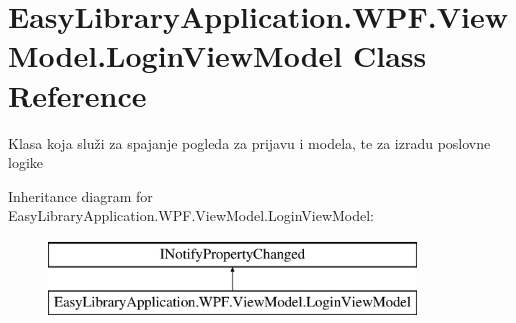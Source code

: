 \hypertarget{class_easy_library_application_1_1_w_p_f_1_1_view_model_1_1_login_view_model}{}\section{Easy\+Library\+Application.\+W\+P\+F.\+View\+Model.\+Login\+View\+Model Class Reference}
\label{class_easy_library_application_1_1_w_p_f_1_1_view_model_1_1_login_view_model}


Klasa koja služi za spajanje pogleda za prijavu i modela, te za izradu poslovne logike  


Inheritance diagram for Easy\+Library\+Application.\+W\+P\+F.\+View\+Model.\+Login\+View\+Model\+:\begin{figure}[H]
\begin{center}
\leavevmode
\includegraphics[height=2.000000cm]{class_easy_library_application_1_1_w_p_f_1_1_view_model_1_1_login_view_model}
\end{center}
\end{figure}
